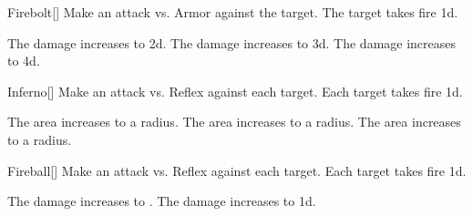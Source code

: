 \lowercase{\hypertarget{spell:Firebolt}{}}\label{spell:Firebolt}
\begin{freeability}[Rank 1]{\hypertarget{spell:Firebolt}{Firebolt}}[]
Make an attack vs. Armor against the target.
\hit The target takes fire  \plus1d.

\rankline
{} The damage increases to  \plus2d.
 The damage increases to  \plus3d.
 The damage increases to  \plus4d.
\end{freeability}
\vspace{0.25em}



\lowercase{\hypertarget{spell:Inferno}{}}\label{spell:Inferno}
\begin{freeability}[Rank 1]{\hypertarget{spell:Inferno}{Inferno}}[]
Make an attack vs. Reflex against each target.
\hit Each target takes fire  \minus1d.

\rankline
{} The area increases to a \arealarge radius.
 The area increases to a \areahuge radius.
 The area increases to a \areaext radius.
\end{freeability}
\vspace{0.25em}



\lowercase{\hypertarget{spell:Fireball}{}}\label{spell:Fireball}
\begin{freeability}[Rank 3]{\hypertarget{spell:Fireball}{Fireball}}[]
Make an attack vs. Reflex against each target.
\hit Each target takes fire  \minus1d.

\rankline
{} The damage increases to .
 The damage increases to  \plus1d.
\end{freeability}
\vspace{0.25em}



